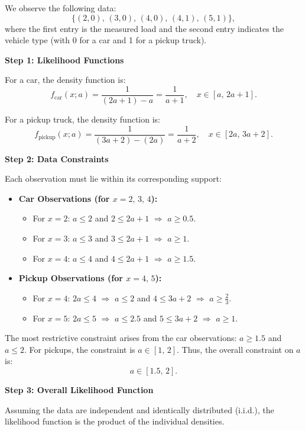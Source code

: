 \documentclass[12pt]{article}
\begin{document}
We observe the following data:
\[
\{(2, 0),\, (3, 0),\, (4, 0),\, (4, 1),\, (5, 1)\},
\]
where the first entry is the measured load and the second entry indicates the vehicle type (with 0 for a car and 1 for a pickup truck).

\noindent \textbf{Step 1: Likelihood Functions}

For a car, the density function is:
\[
f_{\text{car}}(x;a) = \frac{1}{(2a+1)-a} = \frac{1}{a+1}, \quad x \in [a,\, 2a+1].
\]

For a pickup truck, the density function is:
\[
f_{\text{pickup}}(x;a) = \frac{1}{(3a+2)-(2a)} = \frac{1}{a+2}, \quad x \in [2a,\, 3a+2].
\]

\noindent \textbf{Step 2: Data Constraints}

Each observation must lie within its corresponding support:

\begin{itemize}
    \item \textbf{Car Observations (for \(x = 2,\, 3,\, 4\)):}
    \begin{itemize}
        \item For \(x=2\): \(a \leq 2\) and \(2 \leq 2a+1\) \(\Rightarrow\) \(a \geq 0.5\).
        \item For \(x=3\): \(a \leq 3\) and \(3 \leq 2a+1\) \(\Rightarrow\) \(a \geq 1\).
        \item For \(x=4\): \(a \leq 4\) and \(4 \leq 2a+1\) \(\Rightarrow\) \(a \geq 1.5\).
    \end{itemize}
    \item \textbf{Pickup Observations (for \(x = 4,\, 5\)):}
    \begin{itemize}
        \item For \(x=4\): \(2a \leq 4\) \(\Rightarrow\) \(a \leq 2\) and \(4 \leq 3a+2\) \(\Rightarrow\) \(a \geq \frac{2}{3}\).
        \item For \(x=5\): \(2a \leq 5\) \(\Rightarrow\) \(a \leq 2.5\) and \(5 \leq 3a+2\) \(\Rightarrow\) \(a \geq 1\).
    \end{itemize}
\end{itemize}

The most restrictive constraint arises from the car observations: \(a \geq 1.5\) and \(a \leq 2\). For pickups, the constraint is \(a \in [1,\,2]\). Thus, the overall constraint on \(a\) is:
\[
a \in [1.5,\,2].
\]

\noindent \textbf{Step 3: Overall Likelihood Function}

Assuming the data are independent and identically distributed (i.i.d.), the likelihood function is the product of the individual densities.
\end{document}
